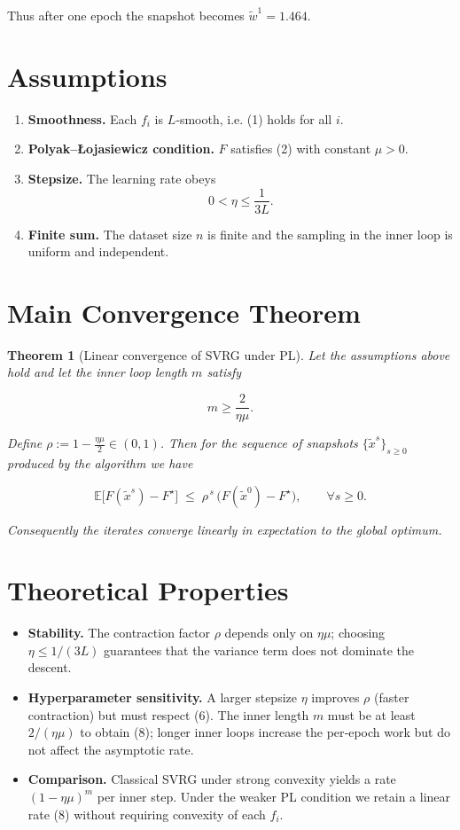 \documentclass{article}
\newtheorem{theorem}{Theorem}
\newcommand{\E}{\mathbb{E}}
\begin{document}
Thus after one epoch the snapshot becomes $\tilde w^{1}=1.464$.

\section*{Assumptions}
\begin{enumerate}
\item \textbf{Smoothness.} Each $f_i$ is $L$‑smooth, i.e. (1) holds for all $i$.
\item \textbf{Polyak–\L{}ojasiewicz condition.} $F$ satisfies (2) with constant $\mu>0$.
\item \textbf{Stepsize.} The learning rate obeys  
\[
0<\eta\le \frac{1}{3L}.
\tag{6}
\]
\item \textbf{Finite sum.} The dataset size $n$ is finite and the sampling in the inner loop is uniform and independent.
\end{enumerate}

\section*{Main Convergence Theorem}
\begin{theorem}[Linear convergence of SVRG under PL]\label{thm:linear}
Let the assumptions above hold and let the inner loop length $m$ satisfy  

\[
m\ge \frac{2}{\eta\mu}.
\tag{7}
\]

Define $\rho:=1-\frac{\eta\mu}{2}\in(0,1)$.  
Then for the sequence of snapshots $\{\tilde{x}^{s}\}_{s\ge0}$ produced by the algorithm we have  

\[
\E\!\bigl[F(\tilde{x}^{s})-F^{\star}\bigr]\;\le\;\rho^{\,s}\,\bigl(F(\tilde{x}^{0})-F^{\star}\bigr),\qquad\forall s\ge0.
\tag{8}
\]

Consequently the iterates converge linearly in expectation to the global optimum.
\end{theorem}

\section*{Theoretical Properties}
\begin{itemize}
\item \textbf{Stability.} The contraction factor $\rho$ depends only on $\eta\mu$; choosing $\eta\le 1/(3L)$ guarantees that the variance term does not dominate the descent.
\item \textbf{Hyperparameter sensitivity.} A larger stepsize $\eta$ improves $\rho$ (faster contraction) but must respect (6). The inner length $m$ must be at least $2/(\eta\mu)$ to obtain (8); longer inner loops increase the per‑epoch work but do not affect the asymptotic rate.
\item \textbf{Comparison.} Classical SVRG under strong convexity yields a rate $(1-\eta\mu)^{m}$ per inner step. Under the weaker PL condition we retain a linear rate (8) without requiring convexity of each $f_i$.
\end{itemize}
\end{document}
